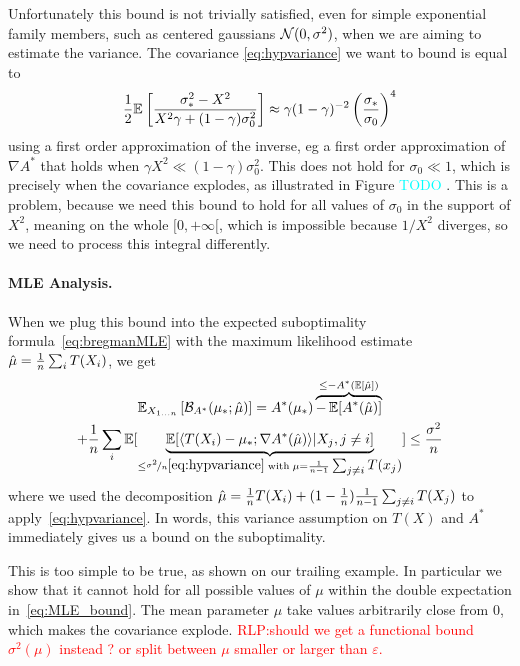 \documentclass{article}
\newcommand{\RLP}[1]{\textcolor{red}{RLP:#1}}
\newcommand{\TODO}[1]{\textcolor{cyan}{TODO #1}}
\newenvironment{example}{
	\begin{mdframed}[backgroundcolor=light-gray, roundcorner=5pt]
}{		
	\end{mdframed}
}
\newcommand*{\expect}[2][]{\ensuremath{\mathbb{E}_{#1} \left[ #2 \right] }} %
\newcommand{\logpart}{A}
\newcommand{\conj}{\logpart^*}
\newcommand{\bregmanconj}{\cB_{\logpart^*}}
\newcommand{\lr}{\gamma} %
\begin{document}
\begin{example}
Unfortunately this bound is not trivially satisfied, even for simple exponential family members, such as centered gaussians ${\mathcal N}(0,\sigma^2)$, when we are aiming to estimate the variance.
The covariance  \eqref{eq:hypvariance} we want to bound is equal to
\begin{align}
	\half \expect{\frac{\sigma_*^2 - X^2 }{ X^2 \lr + (1-\lr) \sigma_0^2 }}
	\approx \lr (1-\lr)^{-2} \left (\frac{\sigma_*}{\sigma_0} \right)^4
\end{align}
using a first order approximation of the inverse, eg a first order approximation of $\nabla \conj$ that holds when $\lr X^2 \ll (1-\lr) \sigma_0^2$. This does not hold for $\sigma_0\ll 1$, which is precisely when the covariance  explodes, as illustrated in Figure \TODO{}. This is a problem, because we need this bound to hold  for all values of $\sigma_0$ in the support of $X^2$, meaning on the whole $[0,+\infty[$, which is impossible because $1/X^2$ diverges, so we need to process this integral differently.   
\end{example}

\paragraph{MLE Analysis.}
When we plug this bound into the expected suboptimality formula~\eqref{eq:bregmanMLE} with the maximum likelihood estimate $\hat \mu =  \frac{1}{n}\sum_i T(X_i)$, we get
\begin{multline}
	\expect[X_{1\dots n}]{\bregmanconj ( \mu_* ;\hat \mu) }
	=\conj(\mu_*) \overbrace{- \E[\conj(\hat \mu)]}^{\leq - \conj(\E[\hat \mu])} \\
	+ \inv{n}\sum_i \E[\underbrace{\E[\langle  T(X_i) - \mu_*; \nabla\conj (\hat \mu) \rangle | X_j, j\neq i]}_{\leq \nicefrac{\sigma^2}{n} \eqref{eq:hypvariance}
	 	\; \text{with}\; \mu=\inv{n-1}\smallsum_{j\neq i} T(x_j)  } ]  \leq \frac{\sigma^2}{n}
\label{eq:MLE_bound}
\end{multline}
where we used the decomposition $\hat \mu = \frac{1}{n}T(X_i) + (1-\frac{1}{n}) \frac{1}{n-1} \sum_{j\neq i}T(X_j)$ to apply~\eqref{eq:hypvariance}. 
In words, this variance assumption on $T(X)$ and $\conj$ immediately gives us a bound on the suboptimality. 

This is too simple to be true, as shown on our trailing example.
In particular we show that it cannot hold for all possible values of $\mu$ within the double expectation in~\eqref{eq:MLE_bound}.
The mean parameter $\mu$ take values arbitrarily close from $0$, which makes the covariance explode.
\RLP{should we get a functional bound $\sigma^2(\mu)$ instead ? or split between $\mu$ smaller or larger than $\varepsilon$.}
\end{document}

